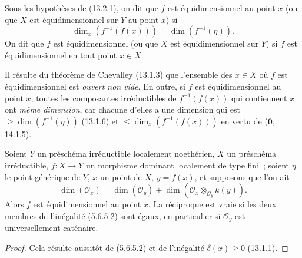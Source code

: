 \begin{definition}[13.2.2]
\label{IV.13.2.2-fr}
Sous les hypothèses de (13.2.1), on dit que $f$ est équidimensionnel au point
$x$ (ou que $X$ est équidimensionnel sur $Y$ au point $x$) si
\[
  \dim_x(f^{-1}(f(x)))=\dim(f^{-1}(\eta)).
\]
On dit que $f$ est équidimensionnel (ou que $X$ est équidimensionnel sur $Y$)
si $f$ est équidimensionnel en tout point $x\in X$.
\end{definition}

Il résulte du théorème de Chevalley (13.1.3) que l'ensemble des $x\in X$ où
$f$ est équidimensionnel est \emph{ouvert non vide}. En outre, si $f$ est
équidimensionnel au point $x$, toutes les composantes irréductibles de
$f^{-1}(f(x))$ qui contiennent $x$ ont \emph{même dimension}, car chacune
d'elles a une dimension qui est $\geq\dim(f^{-1}(\eta))$ (13.1.6) et
$\leq\dim_x(f^{-1}(f(x)))$ en vertu de ($\mathbf 0$, 14.1.5).

\begin{proposition}[13.2.3]
\label{IV.13.2.3-fr}
Soient $Y$ un préschéma irréductible localement noethérien, $X$ un préschéma
irréductible, $f:X\to Y$ un morphisme dominant localement de type fini~;
soient $\eta$ le point générique de $Y$, $x$ un point de $X$, $y=f(x)$, et
supposons que l'on ait
\[
\tag{13.2.3.1}
\label{IV.13.2.3.1-fr}
  \dim(\mathcal O_x)=\dim(\mathcal O_y)
  +\dim(\mathcal O_x\otimes_{\mathcal O_y}k(y)).
\]
Alors $f$ est équidimensionnel au point $x$. La réciproque est vraie si les
deux membres de l'inégalité (5.6.5.2) sont égaux, en particulier si
$\mathcal O_y$ est universellement caténaire.
\end{proposition}

\begin{proof}
Cela résulte aussitôt de (5.6.5.2) et de l'inégalité $\delta(x)\geq0$
(13.1.1).
\end{proof}

